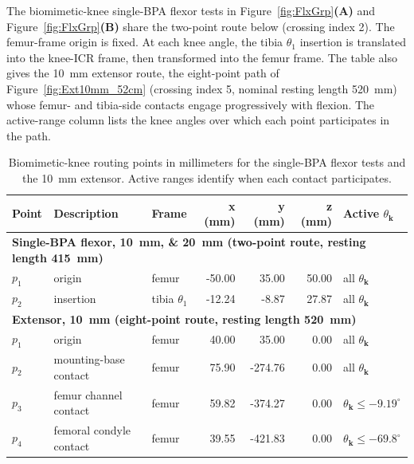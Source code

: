 \documentclass[utf8]{frontiers_suppmat} %
\begin{document}
The biomimetic-knee single-BPA flexor tests in Figure~\ref{fig:FlxGrp}\textbf{(A)} and Figure~\ref{fig:FlxGrp}\textbf{(B)} share the two-point route below (crossing index 2). The femur-frame origin is fixed. At each knee angle, the tibia $\theta_1$ insertion is translated into the knee-ICR frame, then transformed into the femur frame. The table also gives the \qty{10}{\mm} extensor route, the eight-point path of Figure~\ref{fig:Ext10mm_52cm} (crossing index 5, nominal resting length \qty{520}{\milli\metre}) whose femur- and tibia-side contacts engage progressively with flexion. The active-range column lists the knee angles over which each point participates in the path.

\begin{table}[htbp]
\caption{Biomimetic-knee routing points in millimeters for the single-BPA flexor tests and the \qty{10}{\mm} extensor. Active ranges identify when each contact participates.}
\label{tab:RouteBio10}
\centering
\small
\begin{tabular}{lllrrrl}
\toprule
\textbf{Point} & \textbf{Description} & \textbf{Frame} & \textbf{x (mm)} & \textbf{y (mm)} & \textbf{z (mm)} & \textbf{Active $\theta_{\mathbf{k}}$} \\
\midrule
\multicolumn{7}{l}{\textbf{Single-BPA flexor, \qtylist{10;20}{\mm} (two-point route, resting length \qty{415}{\mm})}} \\
\hspace{3mm} $p_{1}$ & origin & femur & -50.00 & 35.00 & 50.00 & all $\theta_{\mathbf{k}}$ \\
\hspace{3mm} $p_{2}$ & insertion & tibia $\theta_{1}$ & -12.24 & -8.87 & 27.87 & all $\theta_{\mathbf{k}}$ \\
\multicolumn{7}{l}{\textbf{Extensor, \qty{10}{\milli\metre} (eight-point route, resting length \qty{520}{\milli\metre})}} \\
\hspace{3mm} $p_{1}$ & origin & femur & 40.00 & 35.00 & 0.00 & all $\theta_{\mathbf{k}}$ \\
\hspace{3mm} $p_{2}$ & mounting-base contact & femur & 75.90 & -274.76 & 0.00 & all $\theta_{\mathbf{k}}$ \\
\hspace{3mm} $p_{3}$ & femur channel contact & femur & 59.82 & -374.27 & 0.00 & $\theta_{\mathbf{k}} \leq -9.19^{\circ}$ \\
\hspace{3mm} $p_{4}$ & femoral condyle contact & femur & 39.55 & -421.83 & 0.00 & $\theta_{\mathbf{k}} \leq -69.8^{\circ}$ \\

\end{tabular}
\end{table}
\end{document}
